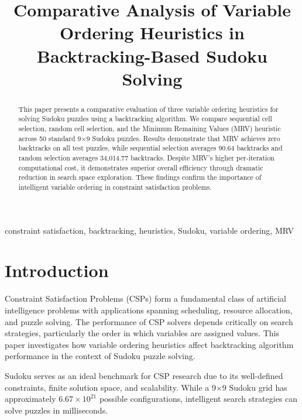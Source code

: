 \documentclass[conference]{IEEEtran}
\begin{document}
\title{Comparative Analysis of Variable Ordering Heuristics in Backtracking-Based Sudoku Solving}

\author{
}

\maketitle

\begin{abstract}
This paper presents a comparative evaluation of three variable ordering heuristics for solving Sudoku puzzles using a backtracking algorithm. We compare sequential cell selection, random cell selection, and the Minimum Remaining Values (MRV) heuristic across 50 standard 9×9 Sudoku puzzles. Results demonstrate that MRV achieves zero backtracks on all test puzzles, while sequential selection averages 90.64 backtracks and random selection averages 34,014.77 backtracks. Despite MRV's higher per-iteration computational cost, it demonstrates superior overall efficiency through dramatic reduction in search space exploration. These findings confirm the importance of intelligent variable ordering in constraint satisfaction problems.
\end{abstract}

\begin{IEEEkeywords}
constraint satisfaction, backtracking, heuristics, Sudoku, variable ordering, MRV
\end{IEEEkeywords}

\section{Introduction}
Constraint Satisfaction Problems (CSPs) form a fundamental class of artificial intelligence problems with applications spanning scheduling, resource allocation, and puzzle solving. The performance of CSP solvers depends critically on search strategies, particularly the order in which variables are assigned values. This paper investigates how variable ordering heuristics affect backtracking algorithm performance in the context of Sudoku puzzle solving.

Sudoku serves as an ideal benchmark for CSP research due to its well-defined constraints, finite solution space, and scalability. While a 9×9 Sudoku grid has approximately $6.67 \times 10^{21}$ possible configurations, intelligent search strategies can solve puzzles in milliseconds.
\end{document}
